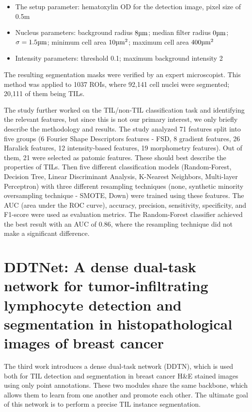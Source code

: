 \begin{itemize}
    \item The setup parameter: hematoxylin OD for the detection image, pixel size of 0.5\textmu m
    \item Nucleus parameters: background radius $8 \text{\textmu m}$; median filter radius $0 \text{\textmu m}$; $\sigma = 1.5 \text{\textmu m}$; minimum cell area $10 \text{\textmu m}^2$; maximum cell area $400 \text{\textmu m}^2$
    \item Intensity parameters: threshold 0.1; maximum background intensity 2
\end{itemize}

The resulting segmentation masks were verified by an expert microscopist. This method was applied to 1037 ROIs, where 92,141 cell nuclei were segmented; 20,111 of them being TILs.

The study further worked on the TIL/non-TIL classification task and identifying the relevant features, but since this is not our primary interest, we only briefly describe the methodology and results. The study analyzed 71 features split into five groups (6 Fourier Shape Descriptors features - FSD, 8 gradient features, 26 Haralick features, 12 intensity-based features, 19 morphometry features). Out of them, 21 were selected as patomic features. These should best describe the properties of TILs. Then five different classification models (Random-Forest, Decision Tree, Linear Discriminant Analysis, K-Nearest Neighbors, Multi-layer Perceptron) with three different resampling techniques (none, synthetic minority oversampling technique - SMOTE, Down) were trained using these features. The AUC (area under the ROC curve), accuracy, precision, sensitivity, specificity, and F1-score were used as evaluation metrics. The Random-Forest classifier achieved the best result with an AUC of 0.86, where the resampling technique did not make a significant difference.

\section{DDTNet: A dense dual-task network for tumor-infiltrating lymphocyte detection and segmentation in histopathological images of breast cancer \cite{Zhang2022}}
\label{section:related-3}

The third work introduces a dense dual-task network (DDTN), which is used both for TIL detection and segmentation in breast cancer H\&E stained images using only point annotations. These two modules share the same backbone, which allows them to learn from one another and promote each other. The ultimate goal of this network is to perform a precise TIL instance segmentation.

